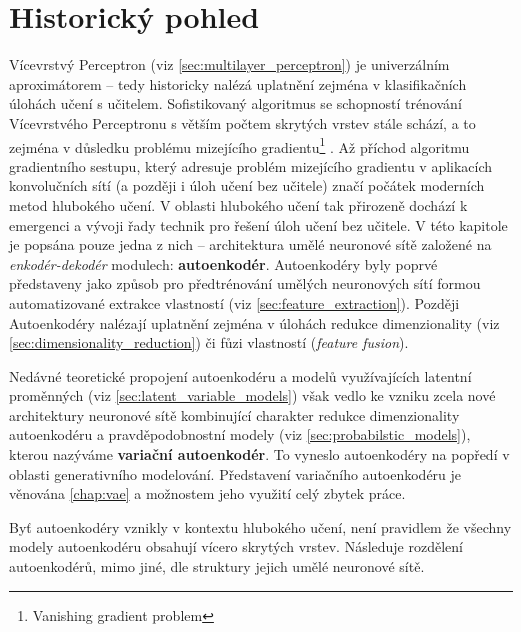\section{Historický pohled}
Vícevrstvý Perceptron (viz \autoref{sec:multilayer_perceptron})
je univerzálním aproximátorem – tedy historicky nalézá uplatnění zejména v klasifikačních úlohách učení s učitelem.
Sofistikovaný algoritmus se schopností trénování Vícevrstvého Perceptronu s větším počtem skrytých vrstev stále schází, a to zejména v důsledku problému mizejícího gradientu\footnote{Vanishing gradient problem} \cite{Hochreiter1998}.
Až příchod algoritmu gradientního sestupu, který adresuje problém mizejícího gradientu v aplikacích konvolučních sítí \cite{LeCun1989} (a později i úloh učení bez učitele) značí počátek moderních metod hlubokého učení.
V oblasti hlubokého učení tak přirozeně dochází k emergenci a vývoji řady technik pro řešení úloh učení bez učitele.
V této kapitole je popsána pouze jedna z nich – architektura umělé neuronové sítě založené na \emph{enkodér-dekodér} modulech: \textbf{autoenkodér}.
Autoenkodéry byly poprvé představeny jako způsob pro předtrénování umělých neuronových sítí formou automatizované extrakce vlastností (viz \autoref{sec:feature_extraction}). 
Později Autoenkodéry nalézají uplatnění zejména v úlohách redukce dimenzionality (viz \autoref{sec:dimensionality_reduction}) či fůzi vlastností (\emph{feature fusion}). \cite{Charte2018}


Nedávné teoretické propojení autoenkodéru a modelů využívajících latentní proměnných (viz \autoref{sec:latent_variable_models}) však vedlo ke vzniku zcela nové architektury neuronové sítě kombinující charakter redukce dimenzionality autoenkodéru a pravděpodobnostní modely (viz \autoref{sec:probabilstic_models}), kterou nazýváme \textbf{variační autoenkodér}.
To vyneslo autoenkodéry na popředí v oblasti generativního modelování. Představení variačního autoenkodéru je věnována \autoref{chap:vae} a možnostem jeho využití celý zbytek práce.

Byť autoenkodéry vznikly v kontextu hlubokého učení, není pravidlem že všechny modely autoenkodéru obsahují vícero skrytých vrstev. Následuje rozdělení autoenkodérů, mimo jiné, dle struktury jejich umělé neuronové sítě.
